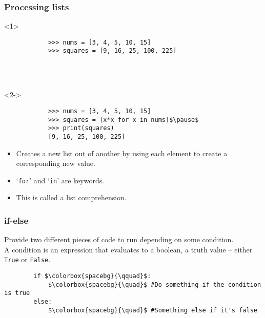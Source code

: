 \documentclass[notes]{beamer}
\begin{document}
	\begin{frame}[fragile]
		\frametitle{Processing lists}
		
		\begin{onlyenv}<1>
			\begin{lstlisting}
			>>> nums = [3, 4, 5, 10, 15]
			>>> squares = [9, 16, 25, 100, 225]
			\end{lstlisting}
			
			~ \\
			~ \\
			
		\end{onlyenv}
		
		\pause
		
		\begin{onlyenv}<2->
			\begin{lstlisting}
			>>> nums = [3, 4, 5, 10, 15]
			>>> squares = [x*x for x in nums]$\pause$
			>>> print(squares)
			[9, 16, 25, 100, 225]
			\end{lstlisting}
		\end{onlyenv}
		
		\pause
		
		\begin{itemize}
			\item Creates a new list out of another by using each element to create a corresponding new value.
			\item `\lstinline|for|' and `\lstinline|in|' are keywords.
			\item This is called a \colorbox{jargonbg}{list comprehension}.
		\end{itemize}
	\end{frame}
	
	
	\begin{frame}[fragile]
		\frametitle{if-else}
		
		Provide two different pieces of code to run depending on some condition.\\
		\pause
		A condition is an expression that evaluates to a boolean, a truth value -- either \colorbox{codebg}{\lstinline|True|} or \colorbox{codebg}{\lstinline|False|}.
		
		\pause
		\begin{lstlisting}
		if $\colorbox{spacebg}{\qquad}$:
		    $\colorbox{spacebg}{\quad}$ #Do something if the condition is true
		else:
		    $\colorbox{spacebg}{\quad}$ #Something else if it's false
		\end{lstlisting}
	\end{frame}
	
\end{document}
